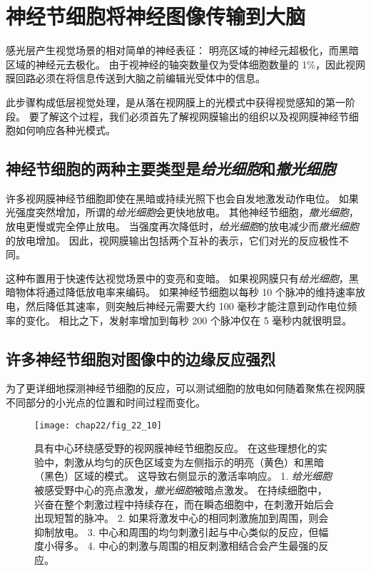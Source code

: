 \section{神经节细胞将神经图像传输到大脑}

感光层产生视觉场景的相对简单的神经表征：
明亮区域的神经元超极化，而黑暗区域的神经元去极化。
由于视神经的轴突数量仅为受体细胞数量的 1\%，因此视网膜回路必须在将信息传送到大脑之前编辑光受体中的信息。


此步骤构成低层视觉处理，是从落在视网膜上的光模式中获得视觉感知的第一阶段。
要了解这个过程，我们必须首先了解视网膜输出的组织以及视网膜神经节细胞如何响应各种光模式。



\subsection{神经节细胞的两种主要类型是\textit{给光细胞}和\textit{撤光细胞}}

许多视网膜神经节细胞即使在黑暗或持续光照下也会自发地激发动作电位。
如果光强度突然增加，所谓的\textit{给光细胞}会更快地放电。
其他神经节细胞，\textit{撤光细胞}，放电更慢或完全停止放电。
当强度再次降低时，\textit{给光细胞}的放电减少而\textit{撤光细胞}的放电增加。
因此，视网膜输出包括两个互补的表示，它们对光的反应极性不同。


这种布置用于快速传达视觉场景中的变亮和变暗。
如果视网膜只有\textit{给光细胞}，黑暗物体将通过降低放电率来编码。
如果神经节细胞以每秒 10 个脉冲的维持速率放电，然后降低其速率，则突触后神经元需要大约 100 毫秒才能注意到动作电位频率的变化。
相比之下，发射率增加到每秒 200 个脉冲仅在 5 毫秒内就很明显。



\subsection{许多神经节细胞对图像中的边缘反应强烈}

为了更详细地探测神经节细胞的反应，可以测试细胞的放电如何随着聚焦在视网膜不同部分的小光点的位置和时间过程而变化。


\begin{figure}[htbp]
	\centering
	\texttt{[image: chap22/fig\_22\_10]}
	\caption{具有中心环绕感受野的视网膜神经节细胞反应。 
		在这些理想化的实验中，刺激从均匀的灰色区域变为左侧指示的明亮（黄色）和黑暗（黑色）区域的模式。 这导致右侧显示的激活率响应。 
		1. \textit{给光细胞}被感受野中心的亮点激发，\textit{撤光细胞}被暗点激发。
		在持续细胞中，兴奋在整个刺激过程中持续存在，而在瞬态细胞中，在刺激开始后会出现短暂的脉冲。 
		2. 如果将激发中心的相同刺激施加到周围，则会抑制放电。 
		3. 中心和周围的均匀刺激引起与中心类似的反应，但幅度小得多。 
		4. 中心的刺激与周围的相反刺激相结合会产生最强的反应。}
	\label{fig:22_10}
\end{figure}


